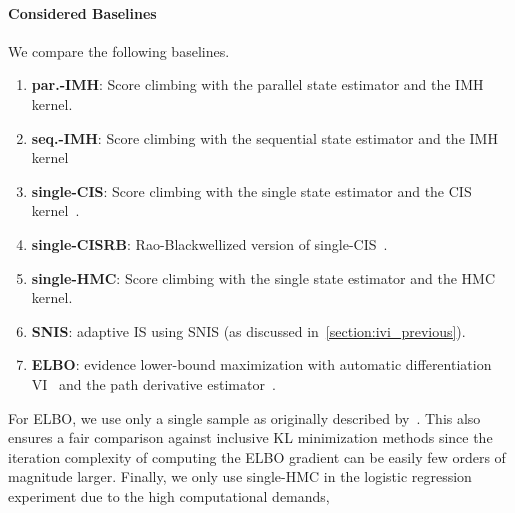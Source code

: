 \paragraph{Considered Baselines}
We compare the following baselines.
\vspace{-0.1in}
\begin{enumerate}[noitemsep]
  \item[\ding{182}] \textbf{par.-IMH}: Score climbing with the parallel state estimator and the IMH kernel. 
  \item[\ding{183}] \textbf{seq.-IMH}: Score climbing with the sequential state estimator and the IMH kernel 
  \item[\ding{184}] \textbf{single-CIS}: Score climbing with the single state estimator and the CIS kernel~\citep{NEURIPS2020_b2070693}.
  \item[\ding{185}] \textbf{single-CISRB}: Rao-Blackwellized version of single-CIS~\citep{NEURIPS2020_b2070693}.
  \item[\ding{184}] \textbf{single-HMC}: Score climbing with the single state estimator and the HMC kernel.
  \item[\ding{186}] \textbf{SNIS}: adaptive IS using SNIS (as discussed in~\cref{section:ivi_previous}).
  \item[\ding{187}] \textbf{ELBO}: evidence lower-bound maximization with automatic differentiation VI~\citep{pmlr-v33-ranganath14, JMLR:v18:16-107} and the path derivative estimator~\citep{NIPS2017_e91068ff}.
\end{enumerate}
For ELBO, we use only a single sample as originally described by~\citet{NIPS2017_e91068ff}.
This also ensures a fair comparison against inclusive KL minimization methods since the iteration complexity of computing the ELBO gradient can be easily few orders of magnitude larger.
Finally, we only use single-HMC in the logistic regression experiment due to the high computational demands, 



